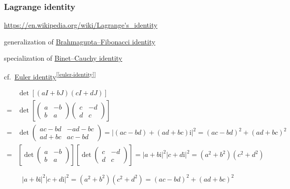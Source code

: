 \documentclass[
]{book}
\theoremstyle{definition}
\theoremstyle{definition}
\theoremstyle{definition}
\theoremstyle{definition}
\theoremstyle{remark}
\begin{document}
\subsubsection{Lagrange identity}\label{lagrange-identity}

\url{https://en.wikipedia.org/wiki/Lagrange's_identity}

generalization of \href{https://en.wikipedia.org/wiki/Lagrange's_identity}{Brahmagupta--Fibonacci identity}

specialization of \href{https://en.wikipedia.org/wiki/Binet–Cauchy_identity}{Binet--Cauchy identity}

cf.~\hyperref[euler-identity]{Euler identity}\textsuperscript{{[}\ref{euler-identity}{]}}

\[
\begin{aligned}
 & \det\left[\left(aI+bJ\right)\left(cI+dJ\right)\right]\\
= & \det\left[\begin{pmatrix}a & -b\\
b & a
\end{pmatrix}\begin{pmatrix}c & -d\\
d & c
\end{pmatrix}\right]\\
= & \det\begin{pmatrix}ac-bd & -ad-bc\\
ad+bc & ac-bd
\end{pmatrix}=\left|\left(ac-bd\right)+\left(ad+bc\right)\mathrm{i}\right|^{2}=\left(ac-bd\right)^{2}+\left(ad+bc\right)^{2}\\
= & \left[\det\begin{pmatrix}a & -b\\
b & a
\end{pmatrix}\right]\left[\det\begin{pmatrix}c & -d\\
d & c
\end{pmatrix}\right]=\left|a+b\mathrm{i}\right|^{2}\left|c+d\mathrm{i}\right|^{2}=\left(a^{2}+b^{2}\right)\left(c^{2}+d^{2}\right)
\end{aligned}
\]

\[
\left|a+b\mathrm{i}\right|^{2}\left|c+d\mathrm{i}\right|^{2}=\left(a^{2}+b^{2}\right)\left(c^{2}+d^{2}\right)=\left(ac-bd\right)^{2}+\left(ad+bc\right)^{2}
\]
\end{document}
